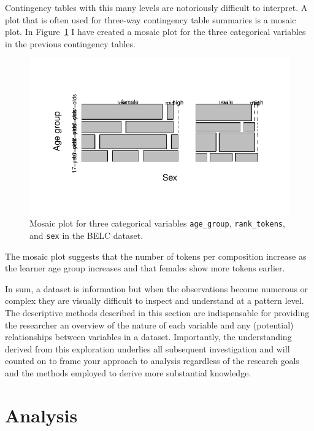 \documentclass[
  letterpaper,
]{scrbook}
\begin{document}
Contingency tables with this many levels are notoriously difficult to
interpret. A plot that is often used for three-way contingency table
summaries is a mosaic plot. In
Figure~\ref{fig-summaries-multivariate-mosaic-belc} I have created a
mosaic plot for the three categorical variables in the previous
contingency tables.

\begin{figure}[h]

{\centering \includegraphics{./approaching-analysis_files/figure-pdf/fig-summaries-multivariate-mosaic-belc-1.pdf}

}

\caption{\label{fig-summaries-multivariate-mosaic-belc}Mosaic plot for
three categorical variables \texttt{age\_group}, \texttt{rank\_tokens},
and \texttt{sex} in the BELC dataset.}

\end{figure}

The mosaic plot suggests that the number of tokens per composition
increase as the learner age group increases and that females show more
tokens earlier.

In sum, a dataset is information but when the observations become
numerous or complex they are visually difficult to inspect and
understand at a pattern level. The descriptive methods described in this
section are indispensable for providing the researcher an overview of
the nature of each variable and any (potential) relationships between
variables in a dataset. Importantly, the understanding derived from this
exploration underlies all subsequent investigation and will counted on
to frame your approach to analysis regardless of the research goals and
the methods employed to derive more substantial knowledge.

\hypertarget{analysis}{%
\section{Analysis}\label{analysis}}
\end{document}
